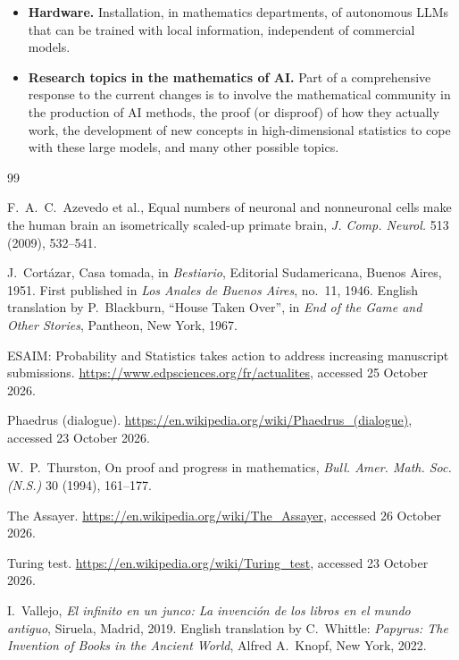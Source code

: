 \documentclass[12pt]{article}
\begin{document}
\begin{itemize}
\begin{itemize}
\end{itemize}
\item\textbf{Hardware.} Installation, in mathematics departments, of autonomous LLMs that can be trained with local information, independent of commercial models.
\item\textbf{Research topics in the mathematics of AI.}
Part of a comprehensive response to the current changes is to involve the mathematical community in the production of AI methods, the proof (or disproof) of how they actually work, the development of new concepts in high-dimensional statistics to cope with these large models, and many other possible topics.
\end{itemize}


\begin{thebibliography}{99}

	F.~A.~C.~Azevedo et al.,
	Equal numbers of neuronal and nonneuronal cells make the human brain
	an isometrically scaled-up primate brain,
	\emph{J. Comp. Neurol.} 513 (2009), 532--541.

J.~Cortázar,
Casa tomada,
in \emph{Bestiario}, Editorial Sudamericana, Buenos Aires, 1951.
First published in \emph{Los Anales de Buenos Aires}, no.~11, 1946.
English translation by P.~Blackburn, ``House Taken Over'',
in \emph{End of the Game and Other Stories}, Pantheon, New York, 1967.


	ESAIM: Probability and Statistics takes action to address increasing
	manuscript submissions.
	\url{https://www.edpsciences.org/fr/actualites},
	accessed 25 October 2026.

	Phaedrus (dialogue).
	\url{https://en.wikipedia.org/wiki/Phaedrus_(dialogue)},
	accessed 23 October 2026.

	W.~P.~Thurston,
	On proof and progress in mathematics,
	\emph{Bull. Amer. Math. Soc. (N.S.)} 30 (1994), 161--177.


	The Assayer.
	\url{https://en.wikipedia.org/wiki/The_Assayer},
	accessed 26 October 2026.

	Turing test.
	\url{https://en.wikipedia.org/wiki/Turing_test},
	accessed 23 October 2026.

	I.~Vallejo,
	\emph{El infinito en un junco: La invención de los libros en el mundo antiguo},
	Siruela, Madrid, 2019.
	English translation by C.~Whittle: \emph{Papyrus: The Invention of Books in the Ancient World}, Alfred A.~Knopf, New York, 2022.

\end{thebibliography}
\end{document}
